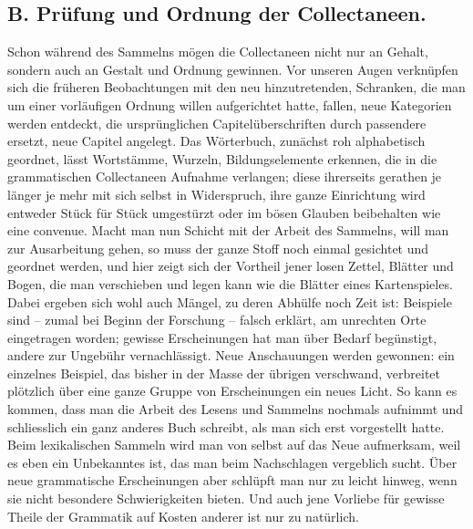 \subsection*{B. Prüfung und Ordnung der Collectaneen.}
Schon während des Sammelns mögen die Collectaneen nicht nur an Gehalt, sondern auch an Gestalt und Ordnung gewinnen. Vor unseren Augen verknüpfen sich die früheren Beobachtungen mit den neu hinzutretenden, Schranken, die man um einer vorläufigen Ordnung willen aufgerichtet hatte, fallen, neue Kategorien werden entdeckt, die ursprünglichen Capitelüberschriften durch passen\label{sp.80}dere ersetzt, neue Capitel angelegt. Das Wörterbuch, zunächst roh alphabetisch geordnet, lässt Wortstämme, Wurzeln, Bildungselemente erkennen, die in die grammatischen Collectaneen Aufnahme verlangen; diese ihrerseits gerathen je länger je mehr mit sich selbst in Widerspruch, ihre ganze Einrichtung wird entweder Stück für Stück umgestürzt oder im bösen Glauben beibehalten wie eine  convenue. Macht man nun Schicht mit der Arbeit des Sammelns, will man zur Ausarbeitung gehen, so muss der ganze Stoff noch einmal gesichtet und geordnet werden, und hier zeigt sich der Vortheil jener losen Zettel, Blätter und Bogen, die man verschieben und legen kann wie die Blätter eines Kartenspieles. Dabei ergeben sich wohl auch Mängel, zu deren Abhülfe noch Zeit ist: Beispiele sind – zumal bei Beginn der Forschung – falsch erklärt, am unrechten Orte eingetragen worden; gewisse Erscheinungen hat man über Bedarf begünstigt, andere zur Ungebühr vernachlässigt. Neue Anschauungen werden gewonnen: ein einzelnes Beispiel, das bisher in der Masse der übrigen verschwand, verbreitet plötzlich über eine ganze Gruppe von Erscheinungen ein neues Licht. So kann es kommen, dass man die Arbeit des Lesens und Sam\label{fp.82}melns nochmals aufnimmt und schliesslich ein ganz anderes Buch schreibt, als man sich erst vorgestellt hatte. Beim lexikalischen Sammeln wird man von selbst auf das Neue aufmerksam, weil es eben ein Unbekanntes ist, das man beim Nachschlagen vergeblich sucht. Über neue grammatische Erscheinungen aber schlüpft man nur zu leicht hinweg, wenn sie nicht besondere Schwierigkeiten bieten. Und auch jene Vorliebe für gewisse Theile der Grammatik auf Kosten anderer ist nur zu natürlich.

